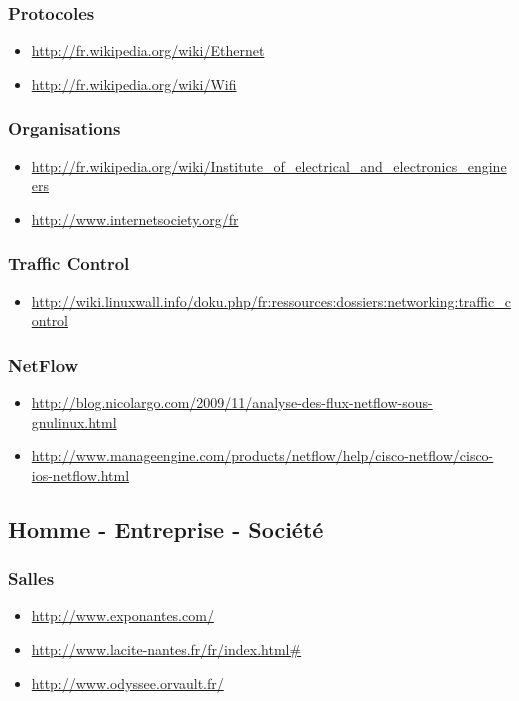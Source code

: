 \documentclass[french]{article}
\begin{document}
\subsubsection*{Protocoles}
\begin{itemize}
\item \url{http://fr.wikipedia.org/wiki/Ethernet}
\item \url{http://fr.wikipedia.org/wiki/Wifi}
\end{itemize}

\subsubsection*{Organisations}
\begin{itemize}
\item \url{http://fr.wikipedia.org/wiki/Institute_of_electrical_and_electronics_engineers}
\item \url{http://www.internetsociety.org/fr}
\end{itemize}

\subsubsection*{Traffic Control}
\begin{itemize}
\item \url{http://wiki.linuxwall.info/doku.php/fr:ressources:dossiers:networking:traffic_control}
\end{itemize}

\subsubsection*{NetFlow}
\begin{itemize}
\item \url{http://blog.nicolargo.com/2009/11/analyse-des-flux-netflow-sous-gnulinux.html}
\item \url{http://www.manageengine.com/products/netflow/help/cisco-netflow/cisco-ios-netflow.html}
\end{itemize}

\subsection{Homme - Entreprise - Société}

\subsubsection*{Salles}
\begin{itemize}
\item \url{http://www.exponantes.com/}
\item \url{http://www.lacite-nantes.fr/fr/index.html#}
\item \url{http://www.odyssee.orvault.fr/}
\end{itemize}
\end{document}
